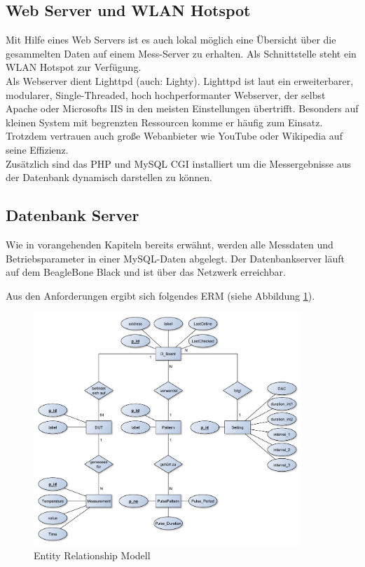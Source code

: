 \subsection{Web Server und WLAN Hotspot}
\label{section_WebServerWLANHotspot}

Mit Hilfe eines Web Servers ist es auch lokal möglich eine Übersicht über die gesammelten Daten auf einem Mess-Server zu erhalten. Als Schnittstelle steht ein WLAN Hotspot zur Verfügung.\\

Als Webserver dient Lighttpd (auch: Lighty). Lighttpd ist laut \cite{bogus2008lighttpd} ein erweiterbarer, modularer, Single-Threaded, hoch hochperformanter Webserver, der selbst Apache oder Microsofts IIS in den meisten Einstellungen übertrifft. Besonders auf kleinen System mit begrenzten Ressourcen komme er häufig zum Einsatz. Trotzdem vertrauen auch große Webanbieter wie YouTube oder Wikipedia auf seine Effizienz.\\
Zusätzlich sind das PHP und MySQL \ac{CGI} installiert um die Messergebnisse aus der Datenbank dynamisch darstellen zu können.
\newpage
 
\subsection{Datenbank Server}
\label{section_EntwurfDatenbank}

Wie in vorangehenden Kapiteln bereits erwähnt, werden alle Messdaten und Betriebsparameter in einer MySQL-Daten abgelegt. Der Datenbankserver läuft auf dem BeagleBone Black und ist über das Netzwerk erreichbar.

Aus den Anforderungen ergibt sich folgendes \ac{ERM} (siehe Abbildung \ref{ERM}). \\

\begin{figure}[H]
\begin{center}
\includegraphics[width=0.9\textwidth]{img/general/ER_Diagramm.pdf}
\caption{Entity Relationship Modell}
\label{ERM}
\end{center}
\end{figure}

